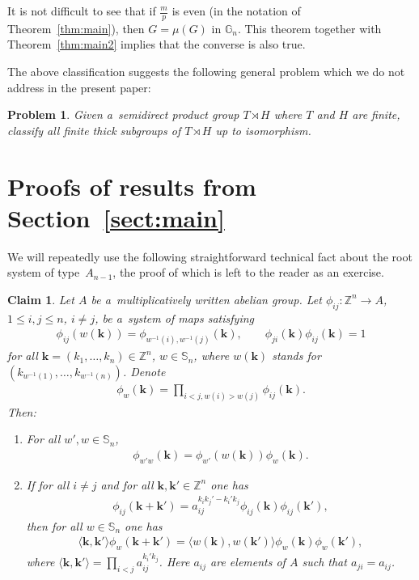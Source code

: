 \documentclass[pdftex]{sigma}
\newtheorem{claim}[Theorem]{Claim}
\newtheorem{problem}[Theorem]{Problem}
{\theoremstyle{definition}
\newtheorem{Definition}[Theorem]{Definition}
\newtheorem{Remark}[Theorem]{Remark}}
\begin{document}
\begin{Remark}
It is not dif\/f\/icult to see that if $\frac{m}{p}$ is even (in the notation of Theorem~\ref{thm:main}), then $G=\mu(G)$ in
$\mathbb G_n$.
This theorem together with Theorem~\ref{thm:main2} implies that the converse is also true.
\end{Remark}

The above classif\/ication suggests the following general problem which we do not address in the present paper:

\begin{problem}
Given a~semidirect product group $T\rtimes H$ where $T$ and $H$ are finite, classify all finite thick subgroups of
$T\rtimes H$ up to isomorphism.
\end{problem}

\section{Proofs of results from Section~\ref{sect:main}}

We will repeatedly use the following straightforward technical fact about the root system of type~$A_{n-1}$, the proof
of which is left to the reader as an exercise.
\begin{claim}
\label{claim:cocycle}
Let $A$ be a~multiplicatively written abelian group.
Let $\phi_{ij}\colon \mathbb Z^n\to A$, $1\le i,j\le n$, $i\ne j$, be a~system of maps satisfying
\begin{gather*}
\phi_{ij}(w(\mathbf k)) = \phi_{w^{-1}(i),w^{-1}(j)}(\mathbf k),
\qquad
\phi_{ji}(\mathbf k)\phi_{ij}(\mathbf k)=1
\end{gather*}
for all $\mathbf k=(k_1,\ldots,k_n)\in\mathbb Z^n$, $w\in\mathbb S_n$, where $w(\mathbf k)$ stands for
$(k_{w^{-1}(1)},\ldots,k_{w^{-1}(n)})$.
Denote
\begin{gather*}
\phi_w(\mathbf k) = \prod\limits_{i<j,w(i)>w(j)} \phi_{ij}(\mathbf k).
\end{gather*}
Then:
\begin{enumerate}\itemsep=0pt
\item[$(a)$] For all $w',w\in \mathbb S_n$,
\begin{gather*}
\phi_{w'w}(\mathbf k) = \phi_{w'}(w(\mathbf k))\phi_w(\mathbf k).
\end{gather*}

\item[$(b)$] If for all $i\ne j$ and for all $\mathbf k,\mathbf{k'}\in \mathbb Z^n$ one has
\begin{gather*}
\phi_{ij}(\mathbf k+\mathbf{k'}) = a_{ij}^{k_ik_j'- k_i'k_j} \phi_{ij}(\mathbf k)\phi_{ij}(\mathbf{k'}),
\end{gather*}
then for all $w\in \mathbb S_n$ one has
\begin{gather*}
\langle \mathbf k,\mathbf{k'}\rangle \phi_{w}(\mathbf k+\mathbf{k'}) = \langle w(\mathbf k),w(\mathbf{k'})\rangle
\phi_{w}(\mathbf k)\phi_{w}(\mathbf{k'}),
\end{gather*}
where $\langle \mathbf k,\mathbf{k'}\rangle= \prod\limits_{i<j}a_{ij}^{k_i'k_j}$.
Here $a_{ij}$ are elements of $A$ such that $a_{ji}=a_{ij}$.
\end{enumerate}
\end{claim}
\end{document}
